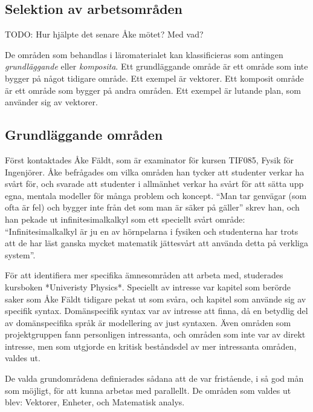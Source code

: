 \begin{binge}
\section{Selektion av arbetsområden}

TODO: Hur hjälpte det senare Åke mötet? Med vad?

\begin{draft}

De områden som behandlas i läromaterialet kan klassificieras som antingen \textit{grundläggande} eller \textit{komposita}. Ett grundläggande område är ett område som inte bygger på något tidigare område. Ett exempel är vektorer. Ett komposit område är ett område som bygger på andra områden. Ett exempel är lutande plan, som använder sig av vektorer.

\subsection{Grundläggande områden}

  Först kontaktades Åke Fäldt, som är examinator för kursen TIF085,
  Fysik för Ingenjörer. Åke befrågades om vilka områden han tycker att
  studenter verkar ha svårt för, och svarade att studenter i allmänhet
  verkar ha svårt för att sätta upp egna, mentala modeller för många
  problem och koncept. ``Man tar genvägar (som ofta är fel) och bygger
  inte från det som man är säker på gäller'' skrev han, och han pekade
  ut infinitesimalkalkyl som ett speciellt svårt område:
  ``Infinitesimalkalkyl är ju en av hörnpelarna i fysiken och
  studenterna har trots att de har läst ganska mycket matematik
  jättesvårt att använda detta på verkliga system''.

  För att identifiera mer specifika ämnesområden att arbeta med,
  studerades kursboken *Univeristy Physics*. Speciellt av intresse var
  kapitel som berörde saker som Åke Fäldt tidigare pekat ut som svåra,
  och kapitel som använde sig av specifik syntax. Domänspecifik syntax
  var av intresse att finna, då en betydlig del av domänspecifika språk
  är modellering av just syntaxen. Även områden som projektgruppen fann
  personligen intressanta, och områden som inte var av direkt intresse,
  men som utgjorde en kritisk beståndsdel av mer intressanta områden,
  valdes ut.

  De valda grundområdena definierades sådana att de var fristående, i
  så god mån som möjligt, för att kunna arbetas med parallellt. De
  områden som valdes ut blev: Vektorer, Enheter, och Matematisk
  analys.


\end{draft}
\end{binge}
